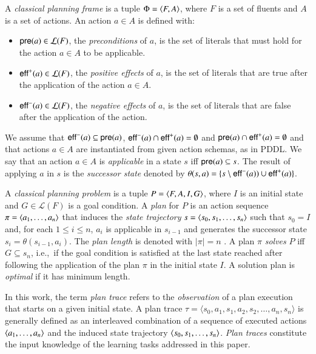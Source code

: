 A {\em classical planning frame} is a tuple $\Phi={\langle F,A \rangle}$, where $F$ is a set of fluents and $A$ is a set of actions. An action $a\in A$ is defined with:
\begin{itemize}
\item $\mathsf{pre}(a)\in\mathcal{L}(F)$, the {\em preconditions} of $a$, is the set of literals that must hold for the action $a\in A$ to be applicable.
\item $\mathsf{eff}^+(a)\in\mathcal{L}(F)$, the {\em positive effects} of $a$, is the set of literals that are true after the application of the action $a\in A$.
\item $\mathsf{eff}^-(a)\in\mathcal{L}(F)$, the {\em negative effects} of $a$, is the set of literals that are false after the application of the action.
\end{itemize}
We assume that $\mathsf{eff}^-(a)\subseteq \mathsf{pre}(a)$, $\mathsf{eff}^-(a)\cap \mathsf{eff}^+(a)=\emptyset$ and $\mathsf{pre}(a)\cap \mathsf{eff}^+(a)=\emptyset$ and that actions $a\in A$ are instantiated from given action schemas, as in PDDL. We say that an action $a\in A$ is {\em applicable} in a state $s$ iff $\mathsf{pre}(a)\subseteq s$. The result of applying $a$ in $s$ is the {\em successor state} denoted by $\theta(s,a)=\{s\setminus\mathsf{eff}^-(a))\cup\mathsf{eff}^+(a)\}$.

A {\em classical planning problem} is a tuple $P={\langle F,A,I,G \rangle}$, where $I$ is an initial state and $G\in\mathcal{L}(F)$ is a goal condition. A {\em plan} for $P$ is an action sequence $\pi={\langle a_1, \ldots, a_n \rangle}$ that induces the {\em state trajectory} $s={\langle s_0, s_1, \ldots, s_n \rangle}$ such that $s_0=I$ and, for each {\small $1\leq i\leq n$}, $a_i$ is applicable in $s_{i-1}$ and generates the successor state $s_i=\theta(s_{i-1},a_i)$. The {\em plan length} is denoted with $|\pi|=n$ . A plan $\pi$ {\em solves} $P$ iff $G\subseteq s_n$, i.e.,~if the goal condition is satisfied at the last state reached after following the application of the plan $\pi$ in the initial state $I$. A solution plan is {\em optimal} if it has minimum length.

In this work, the term \emph{plan trace} refers to the \emph{observation} of a plan execution that starts on a given initial state. A plan trace $\tau = \langle s_0, a_1, s_1, a_2, s_2, \ldots, a_n, s_n \rangle$ is generally defined as an interleaved combination of a sequence of executed actions ${\langle a_1, \ldots, a_n \rangle}$ and the induced state trajectory ${\langle s_0, s_1, \ldots, s_n \rangle}$. \emph{Plan traces} constitute the input knowledge of the learning tasks addressed in this paper.


